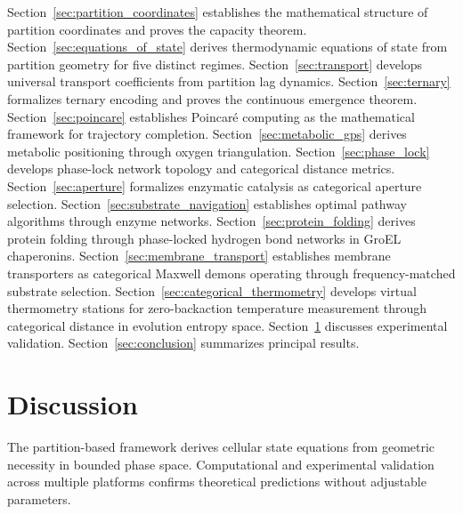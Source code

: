\documentclass[12pt,a4paper]{article}
\theoremstyle{plain}
\theoremstyle{definition}
\theoremstyle{remark}
\begin{document}
Section~\ref{sec:partition_coordinates} establishes the mathematical structure of partition coordinates and proves the capacity theorem. Section~\ref{sec:equations_of_state} derives thermodynamic equations of state from partition geometry for five distinct regimes. Section~\ref{sec:transport} develops universal transport coefficients from partition lag dynamics. Section~\ref{sec:ternary} formalizes ternary encoding and proves the continuous emergence theorem. Section~\ref{sec:poincare} establishes Poincaré computing as the mathematical framework for trajectory completion. Section~\ref{sec:metabolic_gps} derives metabolic positioning through oxygen triangulation. Section~\ref{sec:phase_lock} develops phase-lock network topology and categorical distance metrics. Section~\ref{sec:aperture} formalizes enzymatic catalysis as categorical aperture selection. Section~\ref{sec:substrate_navigation} establishes optimal pathway algorithms through enzyme networks. Section~\ref{sec:protein_folding} derives protein folding through phase-locked hydrogen bond networks in GroEL chaperonins. Section~\ref{sec:membrane_transport} establishes membrane transporters as categorical Maxwell demons operating through frequency-matched substrate selection. Section~\ref{sec:categorical_thermometry} develops virtual thermometry stations for zero-backaction temperature measurement through categorical distance in evolution entropy space. Section~\ref{sec:discussion} discusses experimental validation. Section~\ref{sec:conclusion} summarizes principal results.















\section{Discussion}
\label{sec:discussion}

The partition-based framework derives cellular state equations from geometric necessity in bounded phase space. Computational and experimental validation across multiple platforms confirms theoretical predictions without adjustable parameters.
\end{document}

